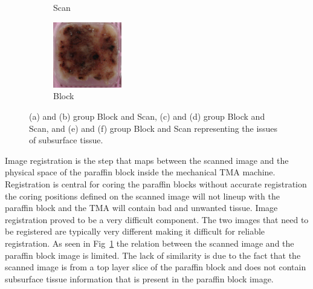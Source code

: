 \documentclass[letterpaper,10pt,oneside]{article}
\begin{document}
\begin{figure}[hbtp]
\begin{subfigure}[b]{.2\textwidth}
    \caption{Scan}
  \end{subfigure}
  \begin{subfigure}[b]{.2\textwidth}
	  \includegraphics[width=3cm]{images/PO14004821_B3.JPG} 
    \caption{Block}
  \end{subfigure}
	\caption{(a) and (b) group Block and Scan, (c) and (d) group Block and Scan, and (e) and (f) group Block and Scan representing the issues of subsurface tissue.}
	\label{fig:subsurface}
\end{figure}
Image registration is the step that maps between the scanned image and the physical space of the paraffin block inside the mechanical TMA machine. Registration is central for coring the paraffin blocks without accurate registration the coring positions defined on the scanned image will not lineup with the paraffin block and the TMA will contain bad and unwanted tissue. Image registration proved to be a very difficult component. The two images that need to be registered are typically very different making it difficult for reliable registration. As seen in Fig~\ref{fig:subsurface} the relation between the scanned image and the paraffin block image is limited. The lack of similarity is due to the fact that the scanned image is from a top layer slice of the paraffin block and does not contain subsurface tissue information that is present in the paraffin block image.
\end{document}

